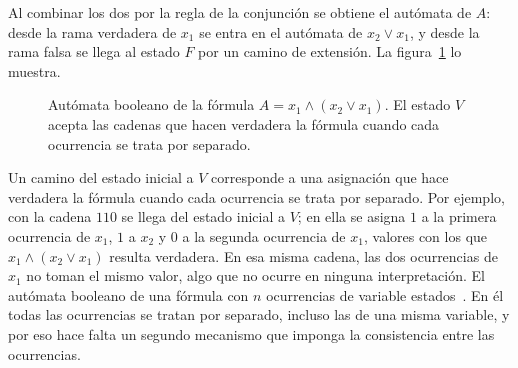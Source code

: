 \documentclass{report}
\theoremstyle{definition}
\theoremstyle{plain}
\theoremstyle{remark}
\begin{document}
Al combinar los dos por la regla de la conjunción se obtiene el autómata
de $A$: desde la rama verdadera de $x_1$ se entra en el autómata de
$x_2 \vee x_1$, y desde la rama falsa se llega al estado $F$ por un
camino de extensión. La figura~\ref{fig:automata-booleano} lo muestra.

\begin{figure}[ht]
  \centering
  \caption{Autómata booleano de la fórmula $A = x_1 \wedge (x_2 \vee
      x_1)$. El estado $V$ acepta las cadenas que hacen verdadera la fórmula
    cuando cada ocurrencia se trata por separado.}
  \label{fig:automata-booleano}
\end{figure}

Un camino del estado inicial a $V$ corresponde a una asignación que hace
verdadera la fórmula cuando cada ocurrencia se trata por separado. Por
ejemplo, con la cadena $110$ se llega del estado inicial a $V$; en ella
se asigna $1$ a la primera ocurrencia de $x_1$, $1$ a $x_2$ y $0$ a la
segunda ocurrencia de $x_1$, valores con los que $x_1 \wedge (x_2 \vee
  x_1)$ resulta verdadera. En esa misma cadena, las dos ocurrencias de
$x_1$ no toman el mismo valor, algo que no ocurre en ninguna interpretación.
El autómata booleano de una fórmula con $n$ ocurrencias de variable
 estados~\cite{fernandezarias2007}. En él todas las
ocurrencias se tratan por separado, incluso las de una misma variable, y
por eso hace falta un segundo mecanismo que imponga la consistencia
entre las ocurrencias.

\end{document}
